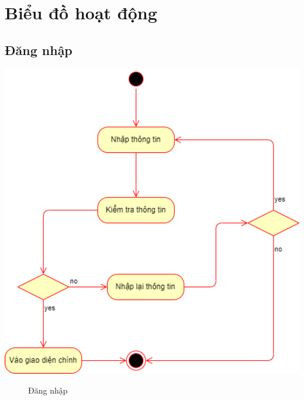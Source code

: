 \section{Biểu đồ hoạt động}
\subsection{Đăng nhập}
  \begin{center}
    \includegraphics[width=1.1\textwidth]{image/activity/login.png}
    \begin{figure}
      \centering
      \caption{Đăng nhập}
    \end{figure}
  \end{center}
  \begin{table}
    \begin{tabular}{|c|c|}
      
    \end{tabular}
  \end{table}

